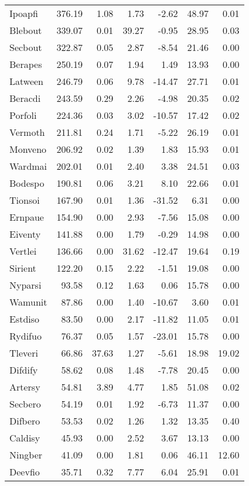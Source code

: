 \begin{table}[htbp!]
\begin{tabular}{lrrrrrr}
Ipoapfi & 376.19 & 1.08 & 1.73 & -2.62 & 48.97 & 0.01 \\
Blebout & 339.07 & 0.01 & 39.27 & -0.95 & 28.95 & 0.03 \\
Secbout & 322.87 & 0.05 & 2.87 & -8.54 & 21.46 & 0.00 \\
Berapes & 250.19 & 0.07 & 1.94 & 1.49 & 13.93 & 0.00 \\
Latween & 246.79 & 0.06 & 9.78 & -14.47 & 27.71 & 0.01 \\
Beracdi & 243.59 & 0.29 & 2.26 & -4.98 & 20.35 & 0.02 \\
Porfoli & 224.36 & 0.03 & 3.02 & -10.57 & 17.42 & 0.02 \\
Vermoth & 211.81 & 0.24 & 1.71 & -5.22 & 26.19 & 0.01 \\
Monveno & 206.92 & 0.02 & 1.39 & 1.83 & 15.93 & 0.01 \\
Wardmai & 202.01 & 0.01 & 2.40 & 3.38 & 24.51 & 0.03 \\
Bodespo & 190.81 & 0.06 & 3.21 & 8.10 & 22.66 & 0.01 \\
Tionsoi & 167.90 & 0.01 & 1.36 & -31.52 & 6.31 & 0.00 \\
Ernpaue & 154.90 & 0.00 & 2.93 & -7.56 & 15.08 & 0.00 \\
Eiventy & 141.88 & 0.00 & 1.79 & -0.29 & 14.98 & 0.00 \\
Vertlei & 136.66 & 0.00 & 31.62 & -12.47 & 19.64 & 0.19 \\
Sirient & 122.20 & 0.15 & 2.22 & -1.51 & 19.08 & 0.00 \\
Nyparsi & 93.58 & 0.12 & 1.63 & 0.06 & 15.78 & 0.00 \\
Wamunit & 87.86 & 0.00 & 1.40 & -10.67 & 3.60 & 0.01 \\
Estdiso & 83.50 & 0.00 & 2.17 & -11.82 & 11.05 & 0.01 \\
Rydifuo & 76.37 & 0.05 & 1.57 & -23.01 & 15.78 & 0.00 \\
Tleveri & 66.86 & 37.63 & 1.27 & -5.61 & 18.98 & 19.02 \\
Difdify & 58.62 & 0.08 & 1.48 & -7.78 & 20.45 & 0.00 \\
Artersy & 54.81 & 3.89 & 4.77 & 1.85 & 51.08 & 0.02 \\
Secbero & 54.19 & 0.01 & 1.92 & -6.73 & 11.37 & 0.00 \\
Difbero & 53.53 & 0.02 & 1.26 & 1.32 & 13.35 & 0.40 \\
Caldisy & 45.93 & 0.00 & 2.52 & 3.67 & 13.13 & 0.00 \\
Ningber & 41.09 & 0.00 & 1.81 & 0.06 & 46.11 & 12.60 \\
Deevfio & 35.71 & 0.32 & 7.77 & 6.04 & 25.91 & 0.01 \\
\bottomrule
\end{tabular}
\end{table}
